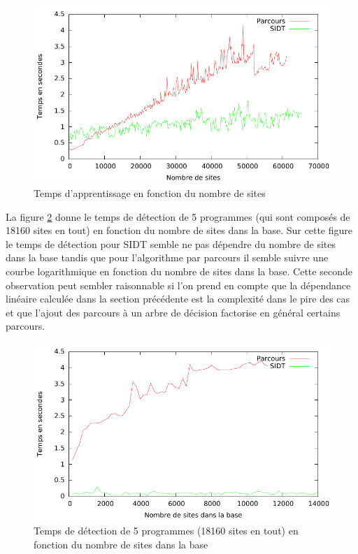 \begin{figure}[h]
\begin{center}
\includegraphics{supports/plots/plotLearn.pdf}
\end{center}
\caption{Temps d'apprentissage en fonction du nombre de sites}
\label{fig:apprentissage}
\end{figure}

La figure \ref{fig:scan} donne le temps de détection de 5 programmes (qui sont composés de 18160 sites en tout) en fonction du nombre de sites dans la base.
Sur cette figure le temps de détection pour SIDT semble ne pas dépendre du nombre de sites dans la base tandis que pour l'algorithme par parcours il semble suivre une courbe logarithmique  en fonction du nombre de sites dans la base.
Cette seconde observation peut sembler raisonnable si l'on prend en compte que la dépendance linéaire calculée dans la section précédente est la complexité dans le pire des cas et que l'ajout des parcours à un arbre de décision factorise en général certains parcours.

\begin{figure}[h]
\begin{center}
\includegraphics{supports/plots/plotScan.pdf}
\end{center}
\caption{Temps de détection de 5 programmes (18160 sites en tout) en fonction du nombre de sites dans la base}
\label{fig:scan}
\end{figure}




